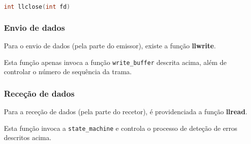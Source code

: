 \begin{lstlisting}[language=C, caption=llclose header]
int llclose(int fd)
\end{lstlisting}


\subsubsection{Envio de dados}

Para o envio de dados (pela parte do emissor), existe a função \textbf{llwrite}.

Esta função apenas invoca a função \texttt{write\_buffer} descrita acima, além de controlar o número de sequência da trama.

\subsubsection{Receção de dados}

Para a receção de dados (pela parte do recetor), é providenciada a função \textbf{llread}.

Esta função invoca a \texttt{state\_machine} e controla o processo de deteção de erros descritos acima.